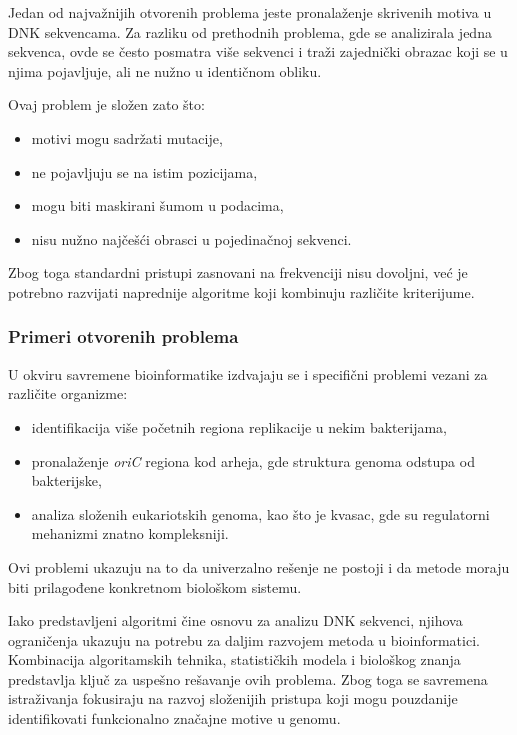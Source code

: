 \documentclass[12pt,oneside]{memoir}
\begin{document}
Jedan od najvažnijih otvorenih problema jeste pronalaženje skrivenih motiva u DNK sekvencama. Za razliku od prethodnih problema, gde se analizirala jedna sekvenca, ovde se često posmatra više sekvenci i traži zajednički obrazac koji se u njima pojavljuje, ali ne nužno u identičnom obliku.

Ovaj problem je složen zato što:
\begin{itemize}
    \item motivi mogu sadržati mutacije,
    \item ne pojavljuju se na istim pozicijama,
    \item mogu biti maskirani šumom u podacima,
    \item nisu nužno najčešći obrasci u pojedinačnoj sekvenci.
\end{itemize}

Zbog toga standardni pristupi zasnovani na frekvenciji nisu dovoljni, već je potrebno razvijati naprednije algoritme koji kombinuju različite kriterijume.

\subsubsection{Primeri otvorenih problema}

U okviru savremene bioinformatike izdvajaju se i specifični problemi vezani za različite organizme:

\begin{itemize}
    \item identifikacija više početnih regiona replikacije u nekim bakterijama,
    \item pronalaženje \textit{oriC} regiona kod arheja, gde struktura genoma odstupa od bakterijske,
    \item analiza složenih eukariotskih genoma, kao što je kvasac, gde su regulatorni mehanizmi znatno kompleksniji.
\end{itemize}

Ovi problemi ukazuju na to da univerzalno rešenje ne postoji i da metode moraju biti prilagođene konkretnom biološkom sistemu.



Iako predstavljeni algoritmi čine osnovu za analizu DNK sekvenci, njihova ograničenja ukazuju na potrebu za daljim razvojem metoda u bioinformatici. Kombinacija algoritamskih tehnika, statističkih modela i biološkog znanja predstavlja ključ za uspešno rešavanje ovih problema. Zbog toga se savremena istraživanja fokusiraju na razvoj složenijih pristupa koji mogu pouzdanije identifikovati funkcionalno značajne motive u genomu.
\end{document}
